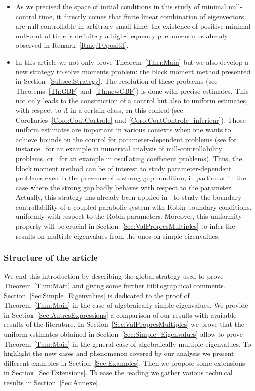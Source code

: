\documentclass[11pt]{article}
\theoremstyle{definition}
\numberwithin{equation}{section}
\numberwithin{figure}{section}
\numberwithin{table}{section}
\begin{document}
\begin{itemize}
\item As we precised the space of initial conditions in this study of minimal null-control time, it directly comes that finite linear combination of eigenvectors are null-controllable in arbitrary small time: the existence of positive minimal null-control time is definitely a high-frequency phenomenon as already observed in Remark~\ref{Rmq:T0positif}.

\item In this article we not only prove Theorem~\ref{Thm:Main} but we also develop a new strategy to solve moments problem: the block moment method presented in Section~\ref{Subsec:Strategy}. The resolution of these problems (see Theorems~\ref{Th:GBF} and~\ref{Th:newGBF}) is done with precise estimates. This not only leads to the construction of a control but also to uniform estimates, with respect to $\Lambda$ in a certain class, on this control (see Corollaries~\ref{Coro:CoutControle} and~\ref{Coro:CoutControle_inferieur}). Those uniform estimates are important in various contexts when one wants to achieve bounds on the control for parameter-dependent problems (see for instance~\cite{AB18,ABM_2018} for an example in numerical analysis of null-controllability problems, or~\cite{LopezZuazua:2002} for an example in oscillating coefficient problems). Thus, the block moment method can be of interest to study parameter-dependent problems even in the presence of a strong gap condition, in particular in the case where the strong gap badly behaves with respect to the parameter. Actually, this strategy has already been applied in~\cite{BoyerBhandari:2019} to study the boundary controllability of a coupled parabolic system with Robin boundary conditions, uniformly with respect to the Robin parameters. Moreover, this uniformity property will be crucial in Section~\ref{Sec:ValPropresMultiples} to infer the results on multiple eigenvalues from the ones on simple eigenvalues.
\end{itemize}



\subsubsection{Structure of the article}

We end this introduction by describing the global strategy used to prove Theorem~\ref{Thm:Main} and giving some further bibliographical comments. Section~\ref{Sec:Simple_Eigenvalues} is dedicated to the proof of Theorem~\ref{Thm:Main} in the case of algebraically simple eigenvalues. We provide in Section~\ref{Sec:AutresExpressions} a comparison of our results with available results of the literature. In Section~\ref{Sec:ValPropresMultiples} we prove that the uniform estimates obtained in Section~\ref{Sec:Simple_Eigenvalues} allow to prove Theorem~\ref{Thm:Main} in the general case of algebraically multiple eigenvalues. To highlight the new cases and phenomenon covered by our analysis we present different examples in Section~\ref{Sec:Examples}. Then we propose some extensions in Section~\ref{Sec:Extensions}. To ease the reading we gather various technical results in Section~\ref{Sec:Annexe}.
\end{document}
